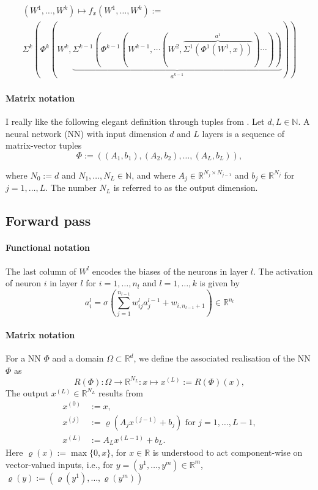 \documentclass[draft]{article}
\def\RealSet{\mathbb{R}}
\begin{document}
\begin{multline}
(W^1,\dots,W^k)\mapsto f_x(W^1,\dots,W^k) := \\
\Sigma^k( \Phi^k( W^k, \underbrace{\Sigma^{k-1}( \Phi^{k-1}( W^{k-1}, \cdots (W^2, \overbrace{\Sigma^1( \Phi^1(W^1, x))}^{a^1}) \cdots) ) }_{a^{k-1}} ))
\end{multline}

\paragraph{Matrix notation}
I really like the following elegant definition through tuples from \cite{Karner:2022}. Let $d, L \in \mathbb{N}$. A neural network (NN) with input dimension $d$ and $L$ layers is
a sequence of matrix-vector tuples
\[
\Phi := ((A_1, b_1), (A_2, b_2), \ldots , (A_L, b_L)),
\]

where $N_0 := d$ and $N_1, \ldots , N_L \in \mathbb{N}$, and where $A_j \in \RealSet^{N_{j}\times N_{j-1}}$ and $b_j \in \RealSet^{N_j}$ for $j = 1, \ldots, L$. The number $N_L$ is referred to as the output dimension.


\subsection{Forward pass}

\paragraph{Functional notation}
The last column of $W^l$ encodes the biases of the neurons in layer $l$. The activation of neuron $i$ in layer $l$ for $i = 1,\dots,n_l$ and $l = 1,\dots,k$ is given by
\[
a^l_i = \sigma \left( \sum_{j=1}^{n_{l-1}} w_{ij}^l a_j^{l-1} + w_{i,n_{l-1}+1} \right) \in \RealSet^{n_l}
\]


\paragraph{Matrix notation}
For a NN $\Phi$ and a domain $\Omega\subset\RealSet^d$, we define the associated realisation of the NN $\Phi$ as
\[
R(\Phi) \colon \Omega \rightarrow \RealSet^{N_L} \colon x \mapsto x^{(L)}:=R(\Phi)(x),
\]
The output $x^{(L)}\in \RealSet^{N_L}$ results from
\begin{align}
x^{(0)} &:= x,\\
x^{(j)} &:= \varrho(A_j x^{(j-1)} + b_j) \text{ for $j=1,\dots,L-1$}, \label{karner-forward-j}\\
x^{(L)} &:= A_L x^{(L-1)} + b_L.
\end{align}
Here $\varrho(x) := \max \{0,x\}$, for $x\in\RealSet$ is understood to act component-wise on vector-valued inputs, i.e., for $y=(y^1,\dots,y^m)\in\RealSet^m$, $\varrho(y) := (\varrho(y^1),\dots,\varrho(y^m))$
\end{document}
